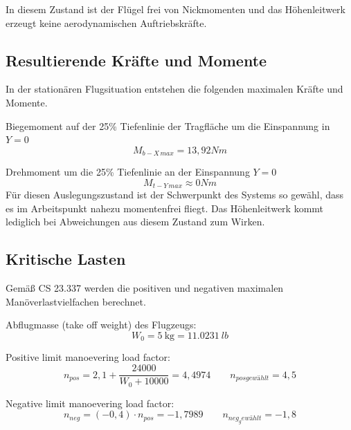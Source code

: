 In diesem Zustand ist der Flügel frei von Nickmomenten und das Höhenleitwerk erzeugt keine aerodynamischen Auftriebskräfte.

\clearpage

\subsection{Resultierende Kräfte und Momente}
\label{Resultierende Kräfte und Momenten Stationär}

In der stationären Flugsituation entstehen die folgenden maximalen Kräfte und Momente.

Biegemoment auf der 25\% Tiefenlinie der Tragfläche um die Einspannung in $Y = 0$
\begin{equation}
M_{b-X\,max} = 13,92 Nm    
\end{equation}

Drehmoment  um die 25\% Tiefenlinie an der Einspannung $Y = 0$
\begin{equation}
M_{t-Y\,max} \approx 0 Nm
\end{equation}
Für diesen Auslegungszustand ist der Schwerpunkt des Systems so gewähl, dass es im Arbeitspunkt nahezu momentenfrei fliegt. Das Höhenleitwerk kommt lediglich bei Abweichungen aus diesem Zustand zum Wirken.

\subsection{Kritische Lasten}

Gemäß CS 23.337 werden die positiven und negativen maximalen Manöverlastvielfachen berechnet.

Abflugmasse (take off weight) des Flugzeugs:
\begin{equation}
\label{eq:K1}
W_{0} = \SI{5}{\kilogram} = \SI{11,0231}{lb}
\end{equation}

Positive limit manoevering load factor:
\begin{equation}
\label{eq:K2}
n_{pos} = 2,1 + \frac{24000}{W_{0}+10000} = 4,4974 \qquad n_{pos gewählt}=4,5
\end{equation}

Negative limit manoevering load factor:
\begin{equation}
\label{eq:K3}
n_{neg} = (-0,4) \cdot n_{pos} = -1,7989 \qquad n_{neg_gewählt}=-1,8
\end{equation}


